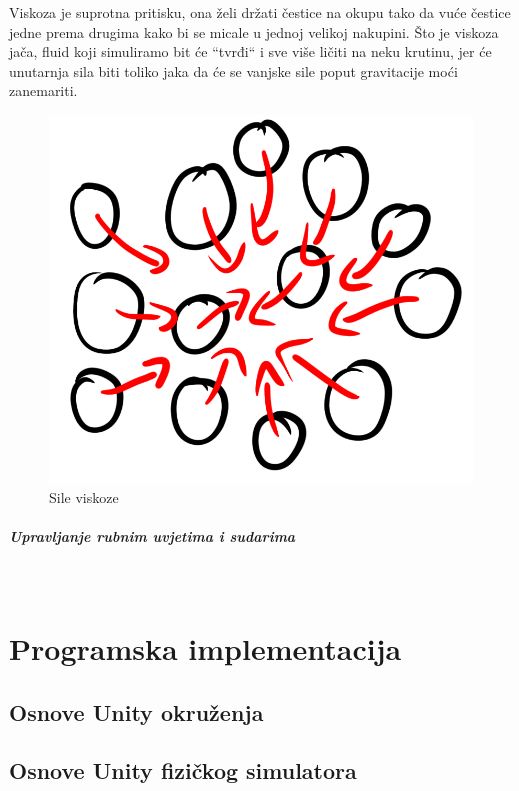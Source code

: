 \documentclass[diplomskirad]{fer}
\newcommand{\paragraphnewline}[1]{\paragraph{#1}\mbox{}\\}
\begin{document}
    \newpage
    Viskoza je suprotna pritisku, ona želi držati čestice na okupu tako da vuće čestice jedne prema drugima kako bi se micale u jednoj velikoj nakupini.
    Što je viskoza jača, fluid koji simuliramo bit će ``tvrđi`` i sve više ličiti na neku krutinu, jer će unutarnja sila biti toliko jaka da će se vanjske sile
    poput gravitacije moći zanemariti.
    \begin{figure}[H]
        \centering
        \includegraphics[scale=1]{images/viscoseForce}
        \caption{
            Sile viskoze
        }
        \label{fig:viscoseForce}
    \end{figure}


    \paragraphnewline{Upravljanje rubnim uvjetima i sudarima}


    \chapter{Programska implementacija}\label{ch:programska-implementacija}


    \section{Osnove Unity okruženja}\label{sec:osnove-unity-okruzenja}


    \section{Osnove Unity fizičkog simulatora}\label{sec:osnove-unity-fizickog-simulatora}
\end{document}
